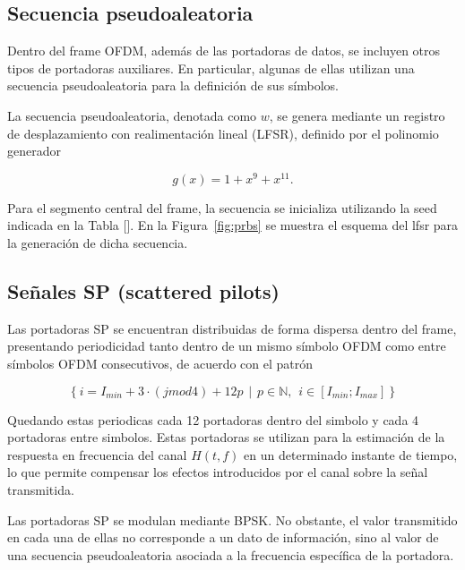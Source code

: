 	\subsection{Secuencia pseudoaleatoria}

	Dentro del frame OFDM, además de las portadoras de datos, se incluyen otros tipos de portadoras auxiliares. En particular, algunas de ellas utilizan una secuencia pseudoaleatoria para la definición de sus símbolos.

	La secuencia pseudoaleatoria, denotada como $w$, se genera mediante un registro de desplazamiento con realimentación lineal (LFSR), definido por el polinomio generador

	\begin{equation}
		g(x) = 1 + x^{9} + x^{11}.
	\end{equation}

	Para el segmento central del frame, la secuencia se inicializa utilizando la seed indicada en la Tabla []. En la Figura~\ref{fig:prbs} se muestra el esquema del lfsr para la generación de dicha secuencia.




	\subsection{Señales SP (scattered pilots)}

	Las portadoras SP se encuentran distribuidas de forma dispersa dentro del frame, presentando periodicidad tanto dentro de un mismo símbolo OFDM como entre símbolos OFDM consecutivos, de acuerdo con el patrón

	 \begin{equation}
	 		\left\{ i = I_{min} + 3 \cdot (j mod 4) + 12 p \hspace{5pt}|\hspace{5pt} p \in \mathbb{N},\hspace{5pt} i \in [I_{min}; I_{max}] \right\}
	 \end{equation}

	 Quedando estas periodicas cada 12 portadoras dentro del simbolo y cada 4 portadoras entre simbolos. Estas portadoras se utilizan para la estimación de la respuesta en frecuencia del canal $H(t,f)$ en un determinado instante de tiempo, lo que permite compensar los efectos introducidos por el canal sobre la señal transmitida.

	Las portadoras SP se modulan mediante BPSK. No obstante, el valor transmitido en cada una de ellas no corresponde a un dato de información, sino al valor de una secuencia pseudoaleatoria asociada a la frecuencia específica de la portadora.

